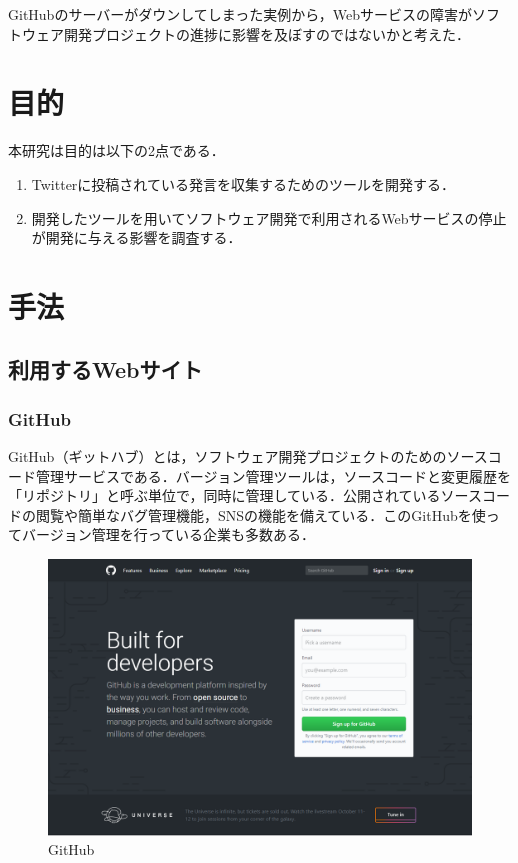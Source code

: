 GitHubのサーバーがダウンしてしまった実例から，Webサービスの障害がソフトウェア開発プロジェクトの進捗に影響を及ぼすのではないかと考えた．

\chapter{目的}
本研究は目的は以下の2点である．
\begin{enumerate}
 \item Twitterに投稿されている発言を収集するためのツールを開発する．
 \item 開発したツールを用いてソフトウェア開発で利用されるWebサービスの停止が開発に与える影響を調査する．
\end{enumerate}


\chapter{手法}

\section{利用するWebサイト}
\subsection{GitHub}
GitHub（ギットハブ）とは，ソフトウェア開発プロジェクトのためのソースコード管理サービスである．バージョン管理ツールは，ソースコードと変更履歴を「リポジトリ」と呼ぶ単位で，同時に管理している．公開されているソースコードの閲覧や簡単なバグ管理機能，SNSの機能を備えている．このGitHubを使ってバージョン管理を行っている企業も多数ある．

 \begin{figure}[htb]
\centering
\includegraphics[width=13cm]{img/github.png}
\caption{GitHub}
\end{figure}

